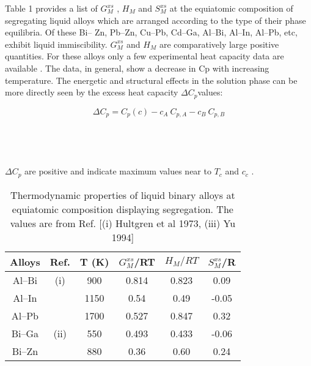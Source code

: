 \documentclass[12pt]{article}
\newcommand*{\1}{\hspace{1pt}}
\begin{document}
        Table 1 provides a list of $G^{xs} _{M}$ , $H _M$ and $S^{xs} _{M}$ at the equiatomic composition 
    of segregating liquid alloys which are arranged according to the type of their phase equilibria. Of these Bi–
    Zn, Pb–Zn, Cu–Pb, Cd–Ga, Al–Bi, Al–In, Al–Pb, etc, exhibit liquid immiscibility. $G^{xs} _{M}$ and
    $ H _M $ are comparatively large positive quantities. For these alloys only a few experimental
    heat capacity data are available . The data, in general, show a decrease in Cp with increasing temperature. The energetic and structural effects in the
    solution phase can be more directly seen by the excess heat capacity $\Delta  C _p $values:

        \begin{equation}
            \Delta  C _p = C_p(c) - c_A \ C_{p,A} - c_B \ C_{p,B} 
        \end{equation}
        \\
        \\
        \\
        \\
    $\Delta  C _p $ are positive and indicate maximum values near to $ T _c$ and $c _c$ . \\


    
    \begin{table}[t!]
    \centering
    \caption{Thermodynamic properties of liquid binary alloys at equiatomic composition displaying
    segregation. The values are from Ref.\cite{s2} [(i) Hultgren et al 1973, (iii) Yu 1994]}
    \begin{tabular}{|c c c c c c|} 
    \hline
    Alloys & Ref. & T (K) & $G ^ {xs} _ {M}$/RT & $H _M/RT$ & $S ^ {xs} _ {M}$/R \\ [0.5ex] 
    \hline\hline
    Al–Bi & (i) & 900 & 0.814 & 0.823 & 0.09 \\ 
    Al–In &     & 1150 & 0.54 & 0.49 & -0.05 \\
    Al–Pb &     & 1700 & 0.527 & 0.847 & 0.32 \\
    Bi–Ga & (ii) & 550 & 0.493 & 0.433 & -0.06 \\
    Bi–Zn &     & 880 & 0.36 & 0.60 & 0.24 \\ [1ex] 
    \hline
    \end{tabular}
    \end{table}
\end{document}
